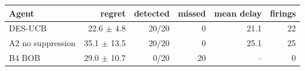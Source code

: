 \begin{tabular}{lrrrrr}
\toprule
Agent & regret & detected & missed & mean delay & firings \\
\midrule
DES-UCB & 22.6 $\pm$ 4.8 & 20/20 & 0 & 21.1 & 22 \\
A2 no suppression & 35.1 $\pm$ 13.5 & 20/20 & 0 & 25.1 & 25 \\
B4 BOB & 29.0 $\pm$ 10.7 & 0/20 & 20 & -- & 0 \\
\bottomrule
\end{tabular}